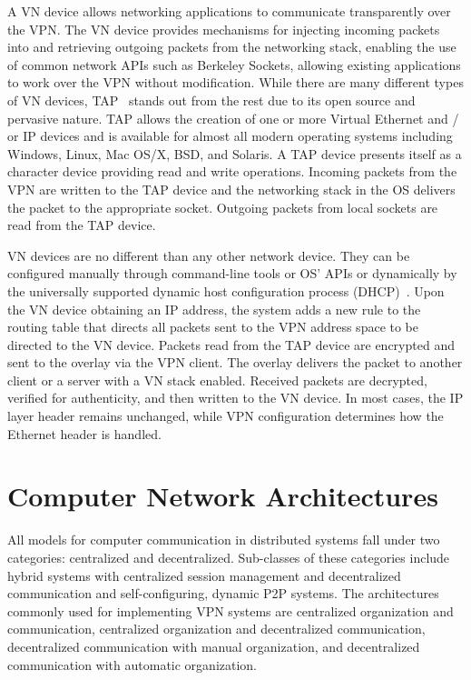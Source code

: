 A VN device allows networking applications to communicate transparently over
the VPN.  The VN device provides mechanisms for injecting incoming packets into
and retrieving outgoing packets from the networking stack, enabling the use of
common network APIs such as Berkeley Sockets, allowing existing applications to
work over the VPN without modification.  While there are many different types
of VN devices, TAP~\cite{tap} stands out from the rest due to its open source
and pervasive nature.  TAP allows the creation of one or more Virtual Ethernet
and / or IP devices and is available for almost all modern operating systems
including Windows, Linux, Mac OS/X, BSD, and Solaris.  A TAP device presents
itself as a character device providing read and write operations.  Incoming
packets from the VPN are written to the TAP device and the networking stack in
the OS delivers the packet to the appropriate socket.  Outgoing packets from
local sockets are read from the TAP device.

VN devices are no different than any other network device.  They can be
configured manually through command-line tools or OS' APIs or dynamically by
the universally supported dynamic host configuration process
(DHCP)~\cite{dhcp0, dhcp1}.  Upon the VN device obtaining an IP address, the
system adds a new rule to the routing table that directs all packets sent to
the VPN address space to be directed to the VN device.  Packets read from the
TAP device are encrypted and sent to the overlay via the VPN client.  The
overlay delivers the packet to another client or a server with a VN stack
enabled.  Received packets are decrypted, verified for authenticity, and then
written to the VN device.  In most cases, the IP layer header remains
unchanged, while VPN configuration determines how the Ethernet header is
handled.

\section{Computer Network Architectures}

All models for computer communication in distributed systems fall under two
categories:  centralized and decentralized.  Sub-classes of these categories
include hybrid systems with centralized session management and decentralized
communication and self-configuring, dynamic P2P systems.  The architectures
commonly used for implementing VPN systems are centralized organization and
communication, centralized organization and decentralized communication,
decentralized communication with manual organization, and decentralized
communication with automatic organization.

